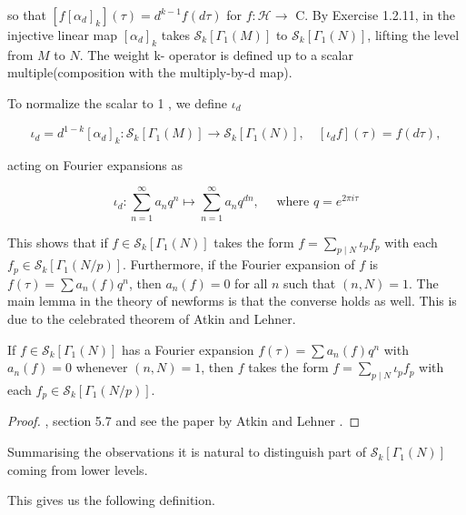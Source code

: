 so that $\left[f\left[\alpha_{d}\right]_{k}\right](\tau)=d^{k-1} f(d \tau)$ for $f: \mathcal{H} \longrightarrow$ C. By Exercise 1.2.11, in \cite{diamond2005first} the injective linear map $\left[\alpha_{d}\right]_{k}$ takes $\mathcal{S}_{k}\left[\Gamma_{1}(M)\right]$ to $\mathcal{S}_{k}\left[\Gamma_{1}(N)\right]$, lifting the level from $M$ to $N$. The weight k- operator is defined up to a scalar multiple(composition with the multiply-by-d map).

To normalize the scalar to 1 , we define  $\iota_{d}$ 

$$
\iota_{d}=d^{1-k}\left[\alpha_{d}\right]_{k}: \mathcal{S}_{k}\left[\Gamma_{1}(M)\right] \longrightarrow \mathcal{S}_{k}\left[\Gamma_{1}(N)\right], \quad\left[\iota_{d} f\right](\tau)=f(d \tau),
$$

acting on Fourier expansions as

$$
\iota_{d}: \sum_{n=1}^{\infty} a_{n} q^{n} \mapsto \sum_{n=1}^{\infty} a_{n} q^{d n}, \quad \text { where } q=e^{2 \pi i \tau}
$$

This shows that if $f \in \mathcal{S}_{k}\left[\Gamma_{1}(N)\right]$ takes the form $f=\sum_{p \mid N} \iota_{p} f_{p}$ with each $f_{p} \in \mathcal{S}_{k}\left[\Gamma_{1}(N / p)\right]$. Furthermore, if the Fourier expansion of $f$ is $f(\tau)=\sum a_{n}(f) q^{n}$, then $a_{n}(f)=0$ for all $n$ such that $(n, N)=1$. The main lemma in the theory of newforms is that the converse holds as well. This is due to the celebrated theorem of Atkin and Lehner. 

\begin{theorem}
    If $f \in \mathcal{S}_{k}\left[\Gamma_{1}(N)\right]$  has a Fourier expansion $f(\tau)=\sum a_{n}(f) q^{n}$ with $a_{n}(f)=0$ whenever $(n, N)=1$, then $f$ takes the form $f=\sum_{p \mid N} \iota_{p} f_{p}$ with each $f_{p} \in \mathcal{S}_{k}\left[\Gamma_{1}(N / p)\right]$.

\end{theorem}
\begin{proof}
    \cite{diamond2005first}, section 5.7 and see the paper by Atkin and Lehner \cite{atkin1970lehner}. 
\end{proof}

Summarising the observations it is natural to distinguish part of $\mathcal{S}_{k}\left[\Gamma_{1}(N)\right]$ coming from lower levels.

This gives us the following definition.

